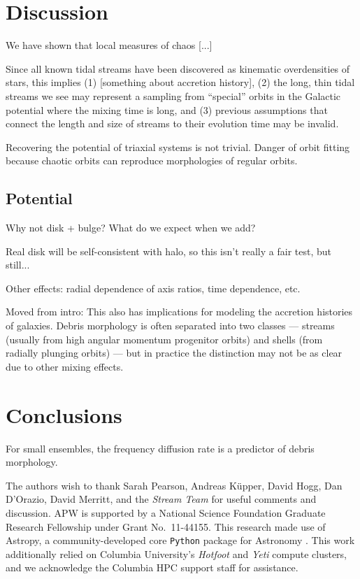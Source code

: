 \documentclass[letterpaper,12pt,preprint]{aastex}
\begin{document}
\section{Discussion}\label{sec:discussion}

We have shown that local measures of chaos [...]

Since all known tidal streams have been discovered as kinematic overdensities of stars, this implies (1) [something about accretion history], (2) the long, thin tidal streams we see may represent a sampling from ``special'' orbits in the Galactic potential where the mixing time is long, and (3) previous assumptions that connect the length and size of streams to their evolution time may be invalid.

Recovering the potential of triaxial systems is not trivial. Danger of orbit fitting because chaotic orbits can reproduce morphologies of regular orbits.

\subsection{Potential}

Why not disk + bulge? What do we expect when we add?

Real disk will be self-consistent with halo, so this isn't really a fair test, but still...

Other effects: radial dependence of axis ratios, time dependence, etc.

Moved from intro:
This also has implications for modeling the accretion histories of galaxies. Debris morphology is often separated into two classes --- streams (usually from high angular momentum progenitor orbits) and shells (from radially plunging orbits) --- but in practice the distinction may not be as clear due to other mixing effects.

\section{Conclusions}\label{sec:conclusions}
For small ensembles, the frequency diffusion rate is a predictor of debris morphology. 

\acknowledgements
The authors wish to thank Sarah Pearson, Andreas K\"upper, David Hogg, Dan D'Orazio, David Merritt, and the \emph{Stream Team} for useful comments and discussion.
APW is supported by a National Science Foundation Graduate Research Fellowship under Grant No.\ 11-44155. 
This research made use of Astropy, a community-developed core \texttt{Python} package for Astronomy \citep{astropy13}.
This work additionally relied on Columbia University's \emph{Hotfoot} and \emph{Yeti} compute clusters, and we acknowledge the Columbia HPC support staff for assistance.



\end{document}
